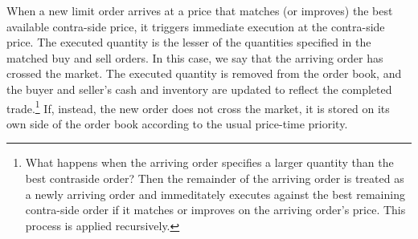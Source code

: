 \documentclass[12pt]{article}
\begin{document}
When a new limit order arrives at a price that matches (or improves) the best available contra-side price, it triggers immediate execution at the contra-side price. 
The executed quantity is the lesser of the quantities specified in the matched buy and sell orders. 
In this case, we say that the arriving order has crossed the market. 
The executed quantity is removed from the order book, and the buyer and seller's cash and inventory are updated to reflect the completed trade.\footnote{
What happens when the arriving order specifies a larger quantity than the best contraside order? 
Then the remainder of the arriving order is treated as a newly arriving order and immeditately executes against the best remaining contra-side order if it matches or improves on the arriving order's price. This process is applied recursively.} 
If, instead, the new order does not cross the market, it is stored on its own side of the order book according to the usual price-time priority.




\end{document}
